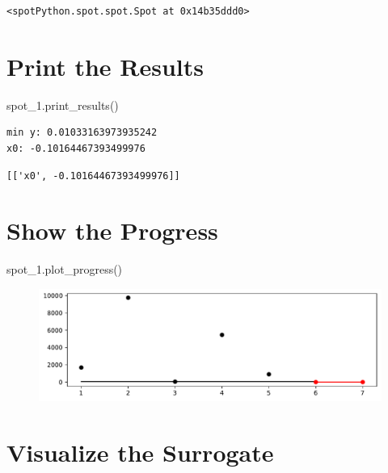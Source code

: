 \documentclass[
  letterpaper,
  DIV=11,
  numbers=noendperiod]{scrreprt}
\newenvironment{Shaded}{\begin{snugshade}}{\end{snugshade}}
\newcommand{\NormalTok}[1]{\textcolor[rgb]{0.00,0.23,0.31}{#1}}
\begin{document}
\begin{verbatim}
<spotPython.spot.spot.Spot at 0x14b35ddd0>
\end{verbatim}

\hypertarget{print-the-results-5}{%
\section{Print the Results}\label{print-the-results-5}}

\begin{Shaded}
\begin{Highlighting}[]
\NormalTok{spot\_1.print\_results()}
\end{Highlighting}
\end{Shaded}

\begin{verbatim}
min y: 0.01033163973935242
x0: -0.10164467393499976
\end{verbatim}

\begin{verbatim}
[['x0', -0.10164467393499976]]
\end{verbatim}

\hypertarget{show-the-progress-2}{%
\section{Show the Progress}\label{show-the-progress-2}}

\begin{Shaded}
\begin{Highlighting}[]
\NormalTok{spot\_1.plot\_progress()}
\end{Highlighting}
\end{Shaded}

\begin{figure}[H]

{\centering \includegraphics{a_04_spot_doc_files/figure-pdf/cell-8-output-1.pdf}

}

\end{figure}

\hypertarget{visualize-the-surrogate}{%
\section{Visualize the Surrogate}\label{visualize-the-surrogate}}
\end{document}
